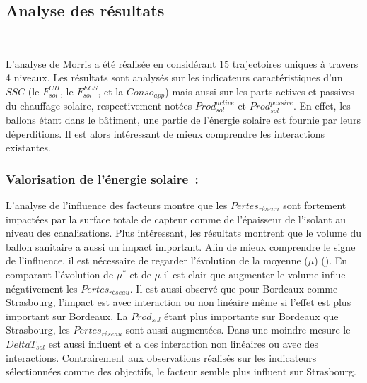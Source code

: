 \subsection{Analyse des résultats} %
\label{sub:analyse_des_resultats}
~

L’analyse de Morris a été réalisée en considérant \num{15} trajectoires uniques à travers
\num{4} niveaux. Les résultats sont analysés sur les indicateurs caractéristiques d’un $SSC$
(le $F_{sol}^{CH}$, le $F_{sol}^{ECS}$, et la $Conso_{app}$) mais aussi sur les parts
actives et passives du chauffage solaire, respectivement notées $Prod_{sol}^{active}$ et
$Prod_{sol}^{passive}$. En effet, les ballons étant dans le bâtiment, une partie de
l’énergie solaire est fournie par leurs déperditions. Il est alors intéressant de
mieux comprendre les interactions existantes.



\subsubsection{Valorisation de l’énergie solaire~:} %
\label{ssub:valorisation_de_l_energie_solaire_}
L’analyse de l’influence des facteurs montre que les $Pertes_{réseau}$ sont fortement
impactées par la surface totale de capteur comme de l’épaisseur de l’isolant au niveau
des canalisations. Plus intéressant, les résultats montrent que le volume du ballon sanitaire
a aussi un impact important. Afin de mieux comprendre le signe de l’influence, il est
nécessaire de regarder l’évolution de la moyenne ($\mu$) (). En comparant l’évolution
de $\mu^{*}$ et de $\mu$ il est clair que augmenter le volume influe négativement les $Pertes_{réseau}$.
Il est aussi observé que pour Bordeaux comme Strasbourg, l’impact est avec interaction ou
non linéaire même si l’effet est plus important sur Bordeaux. La $Prod_{sol}$ étant plus
importante sur Bordeaux que Strasbourg, les $Pertes_{réseau}$ sont aussi augmentées.
Dans une moindre mesure le $DeltaT_{sol}$ est aussi influent et a des interaction non linéaires
ou avec des interactions. Contrairement aux observations réalisés sur les indicateurs
sélectionnées comme des objectifs, le facteur semble plus influent sur Strasbourg.

